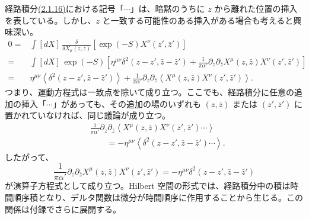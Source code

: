 経路積分\hyperref[eq:2.1.16]{(2.1.16)}における記号「$\cdots$」は、暗黙のうちに $z$ から離れた位置の挿入を表している。しかし、$z$ と一致する可能性のある挿入がある場合も考えると興味深い。
\begin{equation}
\begin{aligned}
0={}&\int[dX]\,\frac{\delta}{\delta X_\mu(z,\bar z)}
\left[\exp(-S)X^\nu(z',\bar z')\right]\\
={}&\int[dX]\,\exp(-S)\left[
\eta^{\mu\nu}\delta^2(z-z',\bar z-\bar z')
+\frac{1}{\pi\alpha'}\partial_z\partial_{\bar z}X^\mu(z,\bar z)
X^\nu(z',\bar z')\right]\\
={}&\eta^{\mu\nu}\left\langle\delta^2(z-z',\bar z-\bar z')\right\rangle
+\frac{1}{\pi\alpha'}\partial_z\partial_{\bar z}
\left\langle X^\mu(z,\bar z)X^\nu(z',\bar z')\right\rangle.
\end{aligned}
\tag{2.1.18}\label{eq:2.1.18}
\end{equation}
つまり、運動方程式は一致点を除いて成り立つ。ここでも、経路積分に任意の追加の挿入「$\cdots$」があっても、その追加の場のいずれも $(z,\bar z)$ または $(z',\bar z')$ に置かれていなければ、同じ議論が成り立つ。
\begin{equation}
\begin{aligned}
&\frac{1}{\pi\alpha'}\partial_z\partial_{\bar z}
\left\langle X^\mu(z,\bar z)X^\nu(z',\bar z')\cdots\right\rangle\\
&\hspace{2em}=-\eta^{\mu\nu}
\left\langle\delta^2(z-z',\bar z-\bar z')\cdots\right\rangle.
\end{aligned}
\tag{2.1.19}\label{eq:2.1.19}
\end{equation}
したがって、
\begin{equation}
\frac{1}{\pi\alpha'}\partial_z\partial_{\bar z}
X^\mu(z,\bar z)X^\nu(z',\bar z')
=-\eta^{\mu\nu}\delta^2(z-z',\bar z-\bar z')
\tag{2.1.20}\label{eq:2.1.20}
\end{equation}
が演算子方程式として成り立つ。Hilbert 空間の形式では、経路積分中の積は時間順序積となり、デルタ関数は微分が時間順序に作用することから生じる。この関係は付録でさらに展開する。

